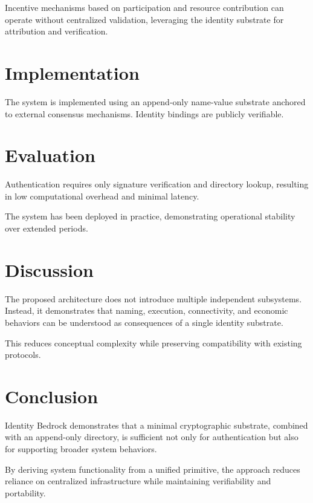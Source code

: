 \documentclass[11pt,a4paper]{article}
\begin{document}
Incentive mechanisms based on participation and resource contribution can operate without centralized validation, leveraging the identity substrate for attribution and verification.

\section{Implementation}

The system is implemented using an append-only name-value substrate anchored to external consensus mechanisms. Identity bindings are publicly verifiable.

\section{Evaluation}

Authentication requires only signature verification and directory lookup, resulting in low computational overhead and minimal latency.

The system has been deployed in practice, demonstrating operational stability over extended periods.

\section{Discussion}

The proposed architecture does not introduce multiple independent subsystems. Instead, it demonstrates that naming, execution, connectivity, and economic behaviors can be understood as consequences of a single identity substrate.

This reduces conceptual complexity while preserving compatibility with existing protocols.

\section{Conclusion}

Identity Bedrock demonstrates that a minimal cryptographic substrate, combined with an append-only directory, is sufficient not only for authentication but also for supporting broader system behaviors.

By deriving system functionality from a unified primitive, the approach reduces reliance on centralized infrastructure while maintaining verifiability and portability.
\end{document}
